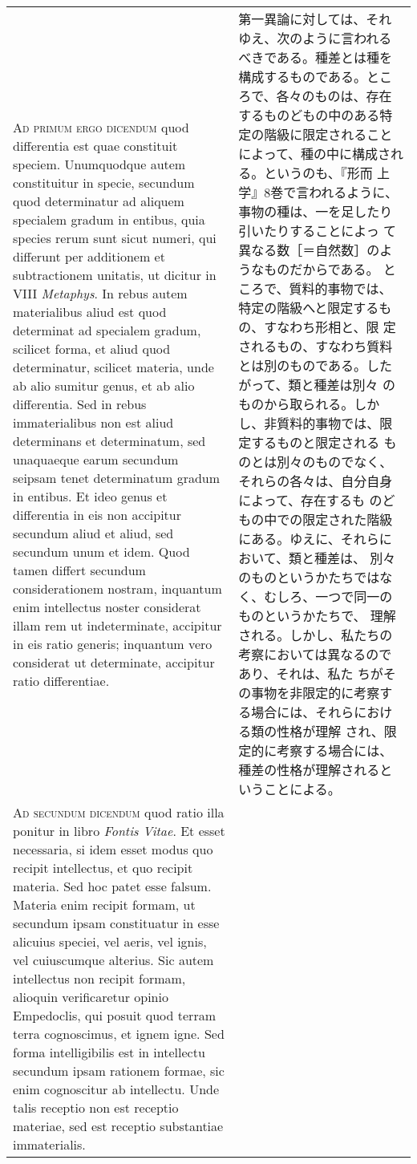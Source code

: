 \documentclass[10pt]{jsarticle} %
\begin{document}
\begin{longtable}{p{21em}p{21em}}
\\


{\scshape Ad primum ergo dicendum} quod differentia est
quae constituit speciem. Unumquodque autem constituitur in specie,
secundum quod determinatur ad aliquem specialem gradum in entibus, quia
species rerum sunt sicut numeri, qui differunt per additionem et
subtractionem unitatis, ut dicitur in VIII {\itshape Metaphys}. In rebus autem
materialibus aliud est quod determinat ad specialem gradum, scilicet
forma, et aliud quod determinatur, scilicet materia, unde ab alio
sumitur genus, et ab alio differentia. Sed in rebus immaterialibus non
est aliud determinans et determinatum, sed unaquaeque earum secundum
seipsam tenet determinatum gradum in entibus. Et ideo genus et
differentia in eis non accipitur secundum aliud et aliud, sed secundum
unum et idem. Quod tamen differt secundum considerationem nostram,
inquantum enim intellectus noster considerat illam rem ut indeterminate,
accipitur in eis ratio generis; inquantum vero considerat ut
determinate, accipitur ratio differentiae.


&

第一異論に対しては、それゆえ、次のように言われるべきである。種差とは種を
構成するものである。ところで、各々のものは、存在するものどもの中のある特
定の階級に限定されることによって、種の中に構成される。というのも、『形而
上学』8巻で言われるように、事物の種は、一を足したり引いたりすることによっ
て異なる数［＝自然数］のようなものだからである。
ところで、質料的事物では、特定の階級へと限定するもの、すなわち形相と、限
 定されるもの、すなわち質料とは別のものである。したがって、類と種差は別々
 のものから取られる。しかし、非質料的事物では、限定するものと限定される
 ものとは別々のものでなく、それらの各々は、自分自身によって、存在するも
 のどもの中での限定された階級にある。ゆえに、それらにおいて、類と種差は、
 別々のものというかたちではなく、むしろ、一つで同一のものというかたちで、
 理解される。しかし、私たちの考察においては異なるのであり、それは、私た
 ちがその事物を非限定的に考察する場合には、それらにおける類の性格が理解
 され、限定的に考察する場合には、種差の性格が理解されるということによる。



\\


{\scshape Ad secundum dicendum} quod ratio illa ponitur
in libro {\itshape Fontis Vitae}. Et esset necessaria, si idem esset modus quo
recipit intellectus, et quo recipit materia. Sed hoc patet esse
falsum. Materia enim recipit formam, ut secundum ipsam constituatur in
esse alicuius speciei, vel aeris, vel ignis, vel cuiuscumque
alterius. Sic autem intellectus non recipit formam, alioquin
verificaretur opinio Empedoclis, qui posuit quod terram terra
cognoscimus, et ignem igne. Sed forma intelligibilis est in intellectu
secundum ipsam rationem formae, sic enim cognoscitur ab intellectu. Unde
talis receptio non est receptio materiae, sed est receptio substantiae
immaterialis.



\end{longtable}
\end{document}
